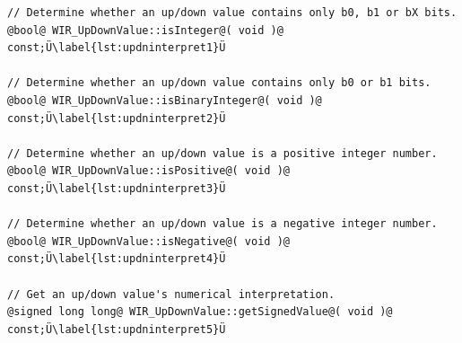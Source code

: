 \begin{lstlisting}[style=code,float=!t,caption={Value Interpretation by Class \texttt{WIR\_UpDownValue}},label=lst:updninterpret]
// Determine whether an up/down value contains only b0, b1 or bX bits.
@bool@ WIR_UpDownValue::isInteger@( void )@ const;Ü\label{lst:updninterpret1}Ü

// Determine whether an up/down value contains only b0 or b1 bits.
@bool@ WIR_UpDownValue::isBinaryInteger@( void )@ const;Ü\label{lst:updninterpret2}Ü

// Determine whether an up/down value is a positive integer number.
@bool@ WIR_UpDownValue::isPositive@( void )@ const;Ü\label{lst:updninterpret3}Ü

// Determine whether an up/down value is a negative integer number.
@bool@ WIR_UpDownValue::isNegative@( void )@ const;Ü\label{lst:updninterpret4}Ü

// Get an up/down value's numerical interpretation.
@signed long long@ WIR_UpDownValue::getSignedValue@( void )@ const;Ü\label{lst:updninterpret5}Ü
\end{lstlisting}

